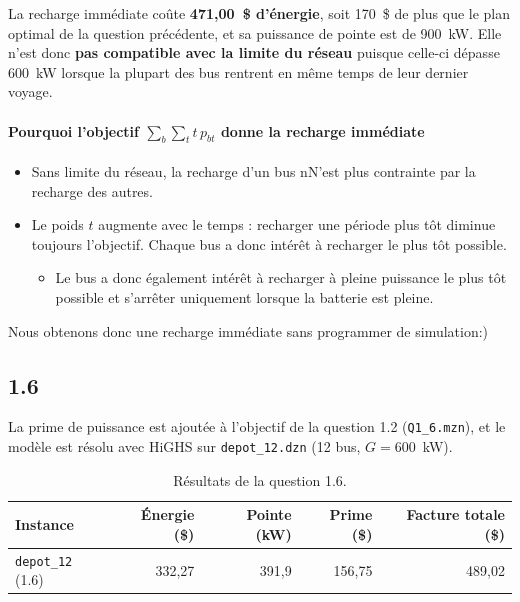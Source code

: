 \documentclass{article}
\begin{document}
La recharge immédiate coûte \textbf{471{,}00~\$ d'énergie}, soit 170~\$ de plus que le plan optimal de la question précédente, et sa puissance de pointe est de 900~kW. Elle n'est donc \textbf{pas compatible avec la limite du réseau} puisque celle-ci dépasse 600~kW lorsque la plupart des bus rentrent en même temps de leur dernier voyage.

\paragraph{Pourquoi l'objectif $\sum_b \sum_t t\,p_{bt}$ donne la recharge immédiate}
\begin{itemize}
  \item Sans limite du réseau, la recharge d'un bus nN'est plus contrainte par la recharge des autres.
  \item Le poids $t$ augmente avec le temps : recharger une période plus tôt diminue toujours l'objectif. Chaque bus a donc intérêt à recharger le plus tôt possible.
  \begin{itemize}
    \item Le bus a donc également intérêt à recharger à pleine puissance le plus tôt possible et s'arrêter uniquement lorsque la batterie est pleine.
  \end{itemize}
\end{itemize}
Nous obtenons donc une recharge immédiate sans programmer de simulation:)




\subsection*{1.6}
La prime de puissance est ajoutée à l'objectif de la question 1.2 (\texttt{Q1\_6.mzn}), et le modèle est résolu avec HiGHS sur \texttt{depot\_12.dzn} (12 bus, $G = 600$~kW).

\begin{table}[H]
  \centering
  \begin{tabular}{|l|r|r|r|r|}
    \hline
    \rowcolor{gray!15}
    Instance & Énergie (\$) & Pointe (kW) & Prime (\$) & Facture totale (\$) \\
    \hline
    \texttt{depot\_12} (1.6) & 332{,}27 & 391{,}9 & 156{,}75 & 489{,}02 \\
    \hline
  \end{tabular}
  \caption{Résultats de la question 1.6.}
  \label{tab:q16}
\end{table}
\end{document}
